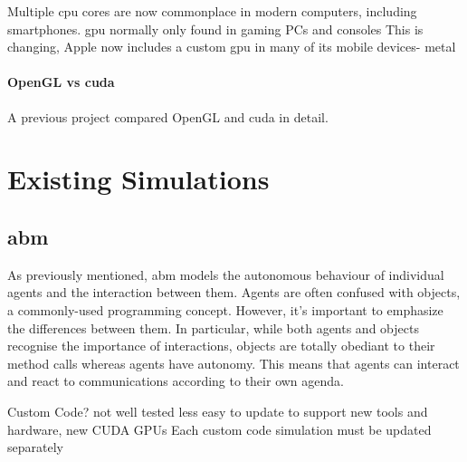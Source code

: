 \documentclass{UoYCSproject}
\begin{document}
Multiple \acrshort{cpu} cores are now commonplace in modern computers, including smartphones.
\acrshort{gpu} normally only found in gaming PCs and consoles
This is changing, Apple now includes a custom \acrshort{gpu} in many of its mobile devices- metal



\paragraph{OpenGL vs \acrshort{cuda}}
A previous project compared OpenGL and \acrshort{cuda} in detail.


\section{Existing Simulations}

\subsection{\acrlong{abm}}
\label{abm}
As previously mentioned, \gls{abm} models the autonomous behaviour of individual agents and the interaction between them.
Agents are often confused with objects, a commonly-used programming concept.
However, it's important to emphasize the differences between them.
In particular, while both agents and objects recognise the importance of interactions, objects are totally obediant to their method calls whereas agents have autonomy.
This means that agents can interact and react to communications according to their own agenda.

Custom Code?\cite{phil_diss}
    not well tested
    less easy to update to support new tools and hardware, new CUDA GPUs
        Each custom code simulation must be updated separately
\end{document}

